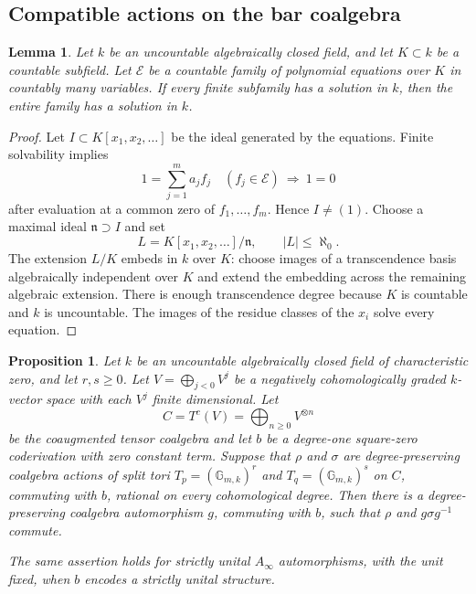 \documentclass[12pt,a4paper,english,reqno]{amsart}
\theoremstyle{plain}
\newtheorem{prp}[thm]{Proposition}
\newtheorem{lem}[thm]{Lemma}
\theoremstyle{definition}
\numberwithin{equation}{section}
\def\ro{\rho}
\def\si{\sigma}
\def\ox{\otimes}
\def\Ds{\bigoplus}
\def\Ainf{A_\infty}
\begin{document}
\subsection{Compatible actions on the bar coalgebra}
\begin{lem}\label{lem:countable}
Let $k$ be an uncountable algebraically closed field, and let $K\subset k$ be a countable subfield. Let $\mathcal E$ be a countable family of polynomial equations over $K$ in countably many variables. If every finite subfamily has a solution in $k$, then the entire family has a solution in $k$.
\end{lem}
\begin{proof}
Let $I\subset K[x_1,x_2,\ldots]$ be the ideal generated by the equations. Finite solvability implies
\[
 1=\sum_{j=1}^m a_j f_j\quad(f_j\in\mathcal E)
 \ \Longrightarrow\ 1=0
\]
after evaluation at a common zero of $f_1,\ldots,f_m$. Hence $I\ne(1)$. Choose a maximal ideal $\mathfrak n\supset I$ and set
\[
 L=K[x_1,x_2,\ldots]/\mathfrak n,\qquad |L|\le\aleph_0.
\] The extension $L/K$ embeds in $k$ over $K$: choose images of a transcendence basis algebraically independent over $K$ and extend the embedding across the remaining algebraic extension. There is enough transcendence degree because $K$ is countable and $k$ is uncountable. The images of the residue classes of the $x_i$ solve every equation.
\end{proof}

\begin{prp}\label{prop:torus}
Let $k$ be an uncountable algebraically closed field of characteristic zero, and let $r,s\geq0$. Let $V=\Ds_{j<0}V^j$ be a negatively cohomologically graded $k$-vector space with each $V^j$ finite dimensional. Let
\[
 C=T^c(V)=\Ds_{n\geq0}V^{\ox n}
\]
be the coaugmented tensor coalgebra and let $b$ be a degree-one square-zero coderivation with zero constant term. Suppose that $\ro$ and $\si$ are degree-preserving coalgebra actions of split tori $T_p=(\mathbb G_{m,k})^r$ and $T_q=(\mathbb G_{m,k})^s$ on $C$, commuting with $b$, rational on every cohomological degree. Then there is a degree-preserving coalgebra automorphism $g$, commuting with $b$, such that $\ro$ and $g\si g^{-1}$ commute.

The same assertion holds for strictly unital $\Ainf$ automorphisms, with the unit fixed, when $b$ encodes a strictly unital structure.
\end{prp}
\end{document}
